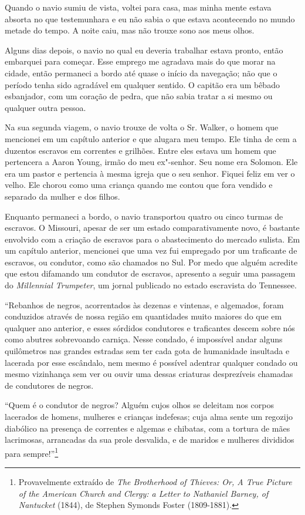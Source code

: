 Quando o navio sumiu de vista, voltei para casa, mas minha mente estava
absorta no que testemunhara e eu não sabia o que estava acontecendo no
mundo metade do tempo. A noite caiu, mas não trouxe sono aos meus olhos.

Alguns dias depois, o navio no qual eu deveria trabalhar estava pronto,
então embarquei para começar. Esse emprego me agradava mais do que morar
na cidade, então permaneci a bordo até quase o início da navegação; não
que o período tenha sido agradável em qualquer sentido. O capitão era um
bêbado esbanjador, com um coração de pedra, que não sabia tratar a si
mesmo ou qualquer outra pessoa.

Na sua segunda viagem, o navio trouxe de volta o Sr. Walker, o homem que
mencionei em um capítulo anterior e que alugara meu tempo. Ele tinha de
cem a duzentos escravos em correntes e grilhões. Entre eles estava um
homem que pertencera a Aaron Young, irmão do meu ex"-senhor. Seu nome era
Solomon. Ele era um pastor e pertencia à mesma igreja que o seu senhor.
Fiquei feliz em ver o velho. Ele chorou como uma criança quando me
contou que fora vendido e separado da mulher e dos filhos.

Enquanto permaneci a bordo, o navio transportou quatro ou cinco turmas
de escravos. O Missouri, apesar de ser um estado comparativamente novo,
é bastante envolvido com a criação de escravos para o abastecimento do
mercado sulista. Em um capítulo anterior, mencionei que uma vez fui
empregado por um traficante de escravos, ou condutor, como são chamados
no Sul. Por medo que alguém acredite que estou difamando um condutor de
escravos, apresento a seguir uma passagem do \emph{Millennial
Trumpeter}, um jornal publicado no estado escravista do Tennessee.

``Rebanhos de negros, acorrentados às dezenas e vintenas, e algemados,
foram conduzidos através de nossa região em quantidades muito maiores do
que em qualquer ano anterior, e esses sórdidos condutores e traficantes
descem sobre nós como abutres sobrevoando carniça. Nesse condado, é
impossível andar alguns quilômetros nas grandes estradas sem ter cada
gota de humanidade insultada e lacerada por esse escândalo, nem mesmo é
possível adentrar qualquer condado ou mesmo vizinhança sem ver ou ouvir
uma dessas criaturas desprezíveis chamadas de condutores de negros.

``Quem é o condutor de negros? Alguém cujos olhos se deleitam nos corpos
lacerados de homens, mulheres e crianças indefesas; cuja alma sente um
regozijo diabólico na presença de correntes e algemas e chibatas, com a
tortura de mães lacrimosas, arrancadas da sua prole desvalida, e de
maridos e mulheres divididos para sempre!''\footnote{Provavelmente
  extraído de \emph{The Brotherhood of Thieves: Or, A True Picture of
  the American Church and Clergy: a Letter to Nathaniel Barney, of
  Nantucket} (1844), de Stephen Symonds Foster (1809-1881).}

